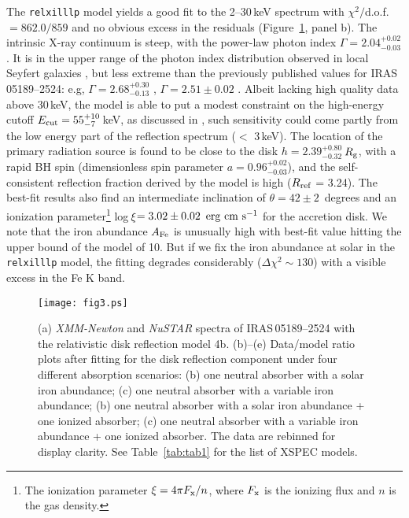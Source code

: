 \documentclass[]{emulateapj}
\def \nustar {{\em NuSTAR }}
\def \xmm {{\em XMM-Newton }}
\begin{document}
The {\tt relxilllp} model yields a good fit to the 2--30\,keV spectrum with $\chi^{2}/$d.o.f.$=862.0/859$ and no obvious excess in the residuals (Figure~\ref{fig:fig3}, panel b). The intrinsic X-ray continuum is steep, with the power-law photon index $\Gamma=2.04^{+0.02}_{-0.03}$. It is in the upper range of the photon index distribution observed in local Seyfert galaxies \citep[e.g.][]{nan94,win09,riv13}, but less extreme than the previously published values for IRAS\,05189--2524: e.g, $\Gamma = 2.68^{+0.30}_{-0.13}$ \citep{ten09}, $\Gamma =2.51 \pm 0.02 $ \citep{ten15}. Albeit lacking high quality data above 30\,keV, the model is able to put a modest constraint on the high-energy cutoff $E_{\rm cut} = 55^{+10}_{-7}$\,keV, as discussed in \cite{gar15a}, such sensitivity could come partly from the low energy part of the reflection spectrum ($<$ 3\,keV). The location of the primary radiation source is found to be close to the disk $h=2.39^{+0.80}_{-0.32}$\,$R_{\rm g}$, with a rapid BH spin (dimensionless spin parameter $a=0.96^{+0.02}_{-0.03}$), and the self-consistent reflection fraction derived by the model is high ($R_{\rm ref}$ = 3.24). The best-fit results also find an intermediate inclination of $\theta = 42\pm2$~degrees and an ionization parameter\footnote{The ionization parameter $\xi=4\pi F_{\rm x}/n$, where $F_{\rm x}$ is the ionizing flux and $n$ is the gas density.} log$~\xi$$=3.02\pm0.02~\rm\,erg~cm~s^{-1}$ for the accretion disk. We note that the iron abundance $A_{\rm Fe}$ is unusually high with best-fit value hitting the upper bound of the model of 10. But if we fix the iron abundance at solar in the {\tt relxilllp} model, the fitting degrades considerably ($\Delta \chi^{2} \sim 130$) with a visible excess in the Fe K band.

\begin{figure}
\centering
\texttt{[image: fig3.ps]}
\caption{(a) \xmm and \nustar spectra of {IRAS\,05189--2524} with the relativistic disk reflection model 4b.  (b)--(e)  Data/model ratio plots after fitting for the disk reflection component under four different absorption scenarios: (b) one neutral absorber with a solar iron abundance; (c) one neutral absorber with a variable iron abundance; (b) one neutral absorber with a solar iron abundance + one ionized absorber; (c) one neutral absorber with a variable iron abundance + one ionized absorber. The data are rebinned for display clarity.  See Table~\ref{tab:tab1} for the list of XSPEC models.
\label{fig:fig3}} 
\end{figure}
\end{document}
